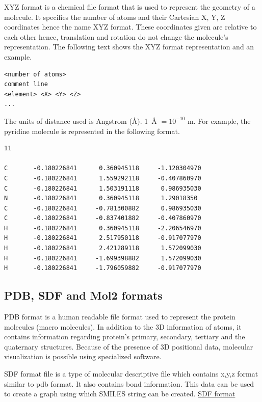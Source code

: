 \documentclass[11pt]{article}
\begin{document}
XYZ format is a chemical file format that is used to represent the geometry of a molecule.
It specifies the number of atoms and their Cartesian X, Y, Z coordinates hence the name XYZ format.
These coordinates given are relative to each other hence, translation and rotation do not change the molecule's representation. 
The following text shows the XYZ format representation and an example.
\cite{XYZ_format}

\begin{verbatim}
<number of atoms>
comment line
<element> <X> <Y> <Z>
...
\end{verbatim}

The units of distance used is Angstrom (\si{\angstrom}).  \SI{1}{\angstrom} $ = 10^{-10}$ m.
For example, the pyridine molecule is represented in the following format.
\cite{XYZ_format}

\begin{verbatim}
11

C       -0.180226841      0.360945118     -1.120304970
C       -0.180226841      1.559292118     -0.407860970
C       -0.180226841      1.503191118      0.986935030
N       -0.180226841      0.360945118      1.29018350
C       -0.180226841     -0.781300882      0.986935030
C       -0.180226841     -0.837401882     -0.407860970
H       -0.180226841      0.360945118     -2.206546970
H       -0.180226841      2.517950118     -0.917077970
H       -0.180226841      2.421289118      1.572099030
H       -0.180226841     -1.699398882      1.572099030
H       -0.180226841     -1.796059882     -0.917077970
\end{verbatim}

\subsection{PDB, SDF and Mol2 formats}

PDB format is a human readable file format used to represent the protein molecules (macro molecules).
In addition to the 3D information of atoms,
it contains information regarding protein's primary, secondary, tertiary
and the quaternary structures.
Because of the presence of 3D positional data, molecular visualization is possible using specialized software. 
\cite{pdb_file_format}
\cite{understanding_pdb_format}

SDF format file is a type of molecular descriptive file which contains x,y,z format similar to pdb format.
It also contains bond information.
This data can be used to create a graph using which SMILES string can be created.
\href{https://en.wikipedia.org/wiki/Chemical_table_file}{SDF format}
\end{document}
